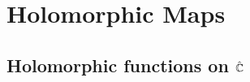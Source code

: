 \section{Holomorphic Maps}
\begin{definition}\label{1:def:holomorphic_maps}

\end{definition}
\subsection{Holomorphic functions on $\hat{\mathbb{C}}$}
